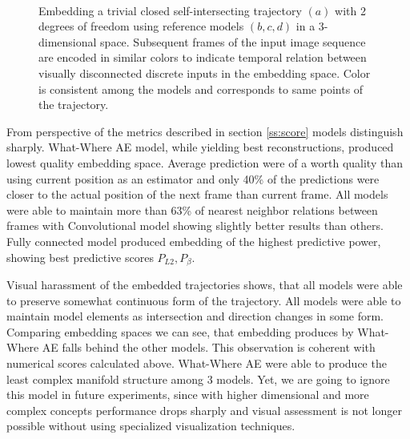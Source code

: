 \begin{figure}[t!]
	\centering
	\\
    	\caption{Embedding a trivial closed self-intersecting trajectory $(a)$ with 2 degrees of freedom using reference models $(b, c, d)$ in a 3-dimensional space. Subsequent frames of the input image sequence are encoded in similar colors to indicate temporal relation between visually disconnected discrete inputs in the embedding space. Color is consistent among the models and corresponds to same points of the trajectory.}
    	\label{fig:model_reco}
\end{figure}

From perspective of the metrics described in section \ref{ss:score} models distinguish sharply. What-Where AE model, while yielding best reconstructions, produced lowest quality embedding space. Average prediction were of a worth quality than using current position as an estimator and only 40\% of the predictions were closer to the actual position of the next frame than current frame. All models were able to maintain more than 63\% of nearest neighbor relations between frames with Convolutional model showing slightly better results than others. Fully connected model produced embedding of the highest predictive power, showing best predictive scores $P_{L2}, P_{\beta}$.

Visual harassment of the embedded trajectories \label{fig:model_reco} shows, that all models were able to preserve somewhat continuous form of the trajectory. All models were able to maintain model elements as intersection and direction changes in some form. Comparing embedding spaces we can see, that embedding produces by What-Where AE falls behind the other models. This observation is coherent with numerical scores calculated above. What-Where AE were able to produce the least complex manifold structure among 3 models. Yet, we are going to ignore this model in future experiments, since with higher dimensional and more complex concepts performance drops sharply and visual assessment is not longer possible without using specialized visualization techniques.

